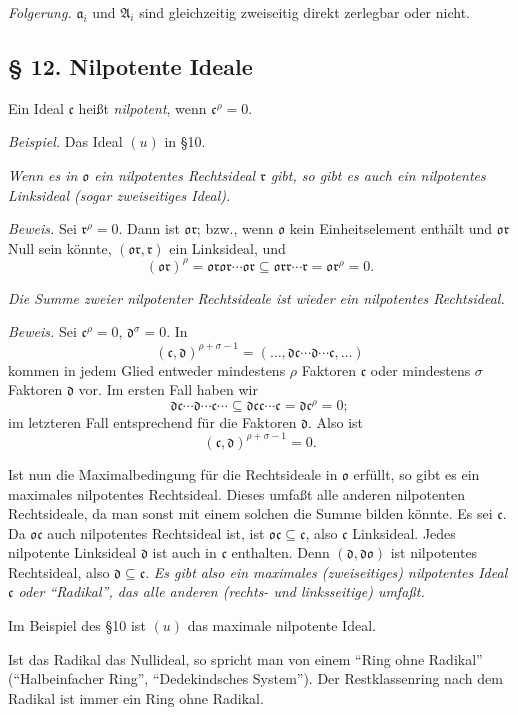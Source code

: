 \documentclass[11pt]{article}
\providecommand{\mA}{\mathfrak{A}}
\providecommand{\mo}{\mathfrak{o}}
\providecommand{\ma}{\mathfrak{a}}
\providecommand{\mc}{\mathfrak{c}}
\providecommand{\md}{\mathfrak{d}}
\providecommand{\mr}{\mathfrak{r}}
\begin{document}
\emph{Folgerung.} $\ma_i$ und $\mA_i$ sind gleichzeitig zweiseitig direkt zerlegbar oder nicht.

\subsection*{§ 12. Nilpotente Ideale}

Ein Ideal $\mc$ heißt \emph{nilpotent}, wenn $\mc^\rho=0$.

\emph{Beispiel.} Das Ideal $(u)$ in §10.

\emph{Wenn es in $\mo$ ein nilpotentes Rechtsideal $\mr$ gibt, so gibt es auch ein nilpotentes Linksideal (sogar zweiseitiges Ideal).}

\emph{Beweis.} Sei $\mr^\rho=0$. Dann ist $\mo\mr$; bzw., wenn $\mo$ kein Einheitselement enthält und $\mo\mr$ Null sein könnte, $(\mo\mr,\mr)$ ein Linksideal, und
\[
        (\mo\mr)^\rho=\mo\mr\mo\mr\cdots\mo\mr\subseteq\mo\mr\mr\cdots\mr=\mo\mr^\rho=0.
\]

\emph{Die Summe zweier nilpotenter Rechtsideale ist wieder ein nilpotentes Rechtsideal.}

\emph{Beweis.} Sei $\mc^\rho=0$, $\md^\sigma=0$. In
\[
        (\mc,\md)^{\rho+\sigma-1}=(\ldots,\md\mc\cdots\md\cdots\mc,\ldots)
\]
kommen in jedem Glied entweder mindestens $\rho$ Faktoren $\mc$ oder mindestens $\sigma$ Faktoren $\md$ vor. Im ersten Fall haben wir
\[
        \md\mc\cdots\md\cdots\mc\cdots\subseteq\md\mc\mc\cdots\mc=\md\mc^\rho=0;
\]
im letzteren Fall entsprechend für die Faktoren $\md$. Also ist
\[
        (\mc,\md)^{\rho+\sigma-1}=0.
\]

Ist nun die Maximalbedingung für die Rechtsideale in $\mo$ erfüllt, so gibt es ein maximales nilpotentes Rechtsideal. Dieses umfaßt alle anderen nilpotenten Rechtsideale, da man sonst mit einem solchen die Summe bilden könnte. Es sei $\mc$. Da $\mo\mc$ auch nilpotentes Rechtsideal ist, ist $\mo\mc\subseteq\mc$, also $\mc$ Linksideal. Jedes nilpotente Linksideal $\md$ ist auch in $\mc$ enthalten. Denn $(\md,\md\mo)$ ist nilpotentes Rechtsideal, also $\md\subseteq\mc$. \emph{Es gibt also ein maximales (zweiseitiges) nilpotentes Ideal $\mc$ oder ``Radikal'', das alle anderen (rechts- und linksseitige) umfaßt.}

Im Beispiel des §10 ist $(u)$ das maximale nilpotente Ideal.

Ist das Radikal das Nullideal, so spricht man von einem ``Ring ohne Radikal'' (``Halbeinfacher Ring'', ``Dedekindsches System''). Der Restklassenring nach dem Radikal ist immer ein Ring ohne Radikal.
\end{document}
